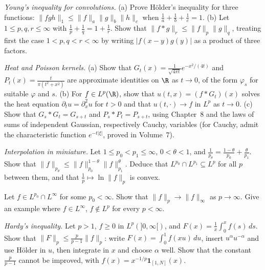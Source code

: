 \begin{exercise}[$\star\star\star$]\label{ex:youngconv}
\emph{Young's inequality for convolutions.} (a) Prove H\"older's inequality for three functions: $\|fgh\|_1\le\|f\|_a\|g\|_b\|h\|_c$ when $\frac1a+\frac1b+\frac1c=1$. (b) Let $1\le p,q,r\le\infty$ with
$\frac1p+\frac1q=1+\frac1r$. Show that $\|f*g\|_r\le\|f\|_p\|g\|_q$, treating first the case $1<p,q<r<\infty$ by writing $|f(x-y)g(y)|$ as a product of three factors.
\end{exercise}

\begin{exercise}[$\star\star$]\label{ex:approxid}
\emph{Heat and Poisson kernels.} (a) Show that $G_t(x)=\frac1{\sqrt{4\pi t}}e^{-x^2/(4t)}$ and $P_t(x)=\frac t{\pi(t^2+x^2)}$ are approximate identities on $\R$ as $t\to0$, of the form $\varphi_s$ for suitable $\varphi$ and
$s$. (b) For $f\in L^p(\R)$, show that $u(t,x)=(f*G_t)(x)$ solves the heat equation $\partial_tu=\partial_x^2u$ for $t>0$ and that $u(t,\cdot)\to f$ in $L^p$ as $t\to0$. (c) Show that $G_s*G_t=G_{s+t}$ and
$P_s*P_t=P_{s+t}$, using Chapter~8 and the laws of sums of independent Gaussian, respectively Cauchy, variables (for Cauchy, admit the characteristic function $e^{-t|\xi|}$, proved in Volume~7).
\end{exercise}

\begin{exercise}[$\star\star$]\label{ex:logconvex}
\emph{Interpolation in miniature.} Let $1\le p_0<p_1\le\infty$, $0<\theta<1$, and $\frac1{p_\theta}=\frac{1-\theta}{p_0}+\frac\theta{p_1}$. Show that $\|f\|_{p_\theta}\le\|f\|_{p_0}^{1-\theta}\|f\|_{p_1}^\theta$. Deduce that
$L^{p_0}\cap L^{p_1}\subseteq L^p$ for all $p$ between them, and that $\frac1p\mapsto\ln\|f\|_p$ is convex.
\end{exercise}

\begin{exercise}[$\star\star$]\label{ex:pinfty}
Let $f\in L^{p_0}\cap L^\infty$ for some $p_0<\infty$. Show that $\|f\|_p\to\|f\|_\infty$ as $p\to\infty$. Give an example where $f\in L^\infty$, $f\notin L^p$ for every $p<\infty$.
\end{exercise}

\begin{exercise}[$\star\star\star$]\label{ex:hardy}
\emph{Hardy's inequality.} Let $p>1$, $f\ge0$ in $L^p(]0,\infty[)$, and $F(x)=\frac1x\int_0^xf(s)\,ds$. Show that $\|F\|_p\le\frac p{p-1}\|f\|_p$: write $F(x)=\int_0^1f(xu)\,du$, insert $u^\alpha u^{-\alpha}$ and use
H\"older in $u$, then integrate in $x$ and choose $\alpha$ well. Show that the constant $\frac p{p-1}$ cannot be improved, with $f(x)=x^{-1/p}\mathbf 1_{[1,N]}(x)$.
\end{exercise}

